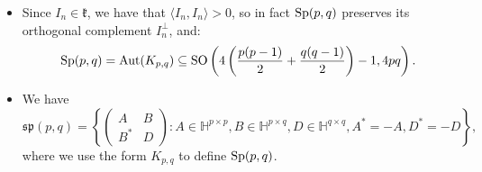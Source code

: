 \documentclass{report}
\begin{document}
\begin{itemize}
    \item Since $I_n \in \mathfrak k$, we have that $\langle I_n, I_n \rangle >0$, so in fact $\operatorname{{\mathrm{Sp}}}(p,q)$ preserves its orthogonal complement $I_n^\perp$, and:
    \[
    \operatorname{{\mathrm{Sp}}}(p,q) = \mathrm{Aut}(K_{p,q}) \subseteq \operatorname{{\mathrm{SO}}}\left(4\left( \frac{p(p-1)}{2} + \frac{q(q-1)}{2} \right) - 1, 4pq \right).
    \]
    \item We have
    \[
    \mathfrak{sp}(p,q) = \left\{
        \begin{pmatrix}
            A & B \\
            B^* & D
        \end{pmatrix} : A \in \mathbb H^{p \times p}, B \in \mathbb H^{p \times q}, D \in \mathbb H^{q\times q},  A^* = -A, D^* = -D
    \right\},
    \]
    where we use the form $K_{p,q}$ to define $\operatorname{{\mathrm{Sp}}}(p,q)$.
\end{itemize}
\end{document}
